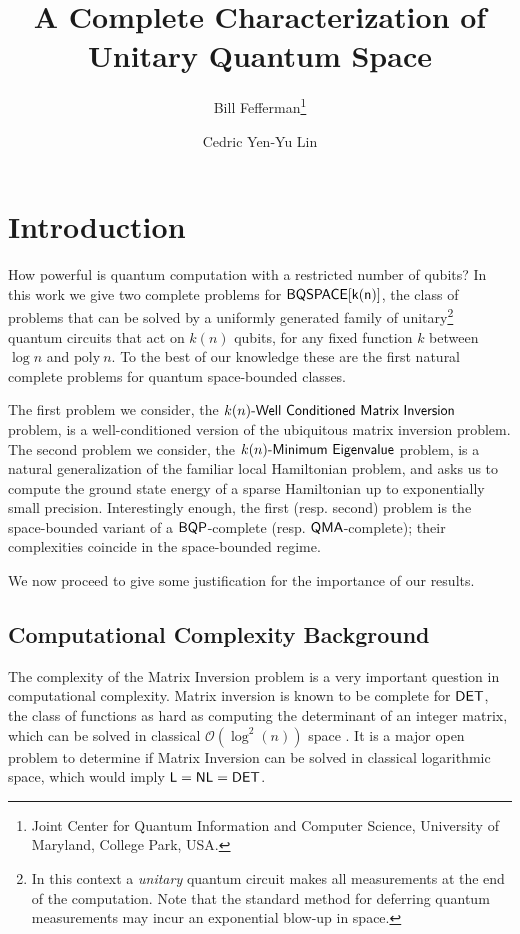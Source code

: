 \documentclass[11pt]{article}
\title{A Complete Characterization of Unitary Quantum Space\vspace{-.1in}}%
\author{Bill Fefferman\thanks{Joint Center for Quantum Information and Computer Science, University of Maryland,
College Park, USA.}
\and {Cedric Yen-Yu Lin\samethanks}}
\date{}
\numberwithin{lemma}{section}
\theoremstyle{definition}
\newcommand\BQP{\sf{BQP}}
\newcommand\BQSPACE{\sf{BQSPACE}}
\newcommand\DET{{\sf{DET}}}
\newcommand\Logspace{{\sf{L}}}
\newcommand\NL{{\sf{NL}}}
\newcommand\QMA{{\sf{QMA}}}
\newcommand{\polyn}{\mathrm{poly\:}}
\newcommand\spechamiltonian[1]{#1\textit{\sf{-Minimum Eigenvalue}}}
\newcommand\matrixinversion[1]{#1\textit{\sf{-Well Conditioned Matrix Inversion}}}
\begin{document}
\vspace{-2.0in}
\maketitle
\setcounter{page}{0}
\thispagestyle{empty}
\pagestyle{empty}
\vspace{-.7in}
\section{Introduction}
How powerful is quantum computation with a restricted number of qubits? In this work we give two complete problems for $\BQSPACE[k(n)]$, the class of problems that can be solved by a uniformly generated family of unitary\footnote{In this context a {\emph{unitary}} quantum circuit makes all measurements at the end of the computation.  Note that the standard method for deferring quantum measurements may incur an exponential blow-up in space.} quantum circuits that act on $k(n)$ qubits, for any fixed function $k$ between $\log{n}$ and $\polyn{n}$. To the best of our knowledge these are the first natural complete problems for quantum space-bounded classes.

The first problem we consider, the $\matrixinversion{k(n)}$ problem, is a well-conditioned version of the ubiquitous matrix inversion problem. The second problem we consider, the $\spechamiltonian{k(n)}$ problem, is a natural generalization of the familiar local Hamiltonian problem, and asks us to compute the ground state energy of a sparse Hamiltonian up to exponentially small precision. Interestingly enough, the first (resp. second) problem is the space-bounded variant of a $\BQP$-complete (resp. $\QMA$-complete); their complexities coincide in the space-bounded regime.

We now proceed to give some justification for the importance of our results.

\subsection{Computational Complexity Background}
The complexity of the Matrix Inversion problem is a very important question in computational complexity. Matrix inversion is known to be complete for $\DET$, the class of functions as hard as computing the determinant of an integer matrix, which can be solved in classical $\mathcal{O}(\log^{2}(n))$ space \cite{berkowitz, cook}. It is a major open problem to determine if Matrix Inversion can be solved in classical logarithmic space, which would imply $\Logspace=\NL=\DET$.
\end{document}
